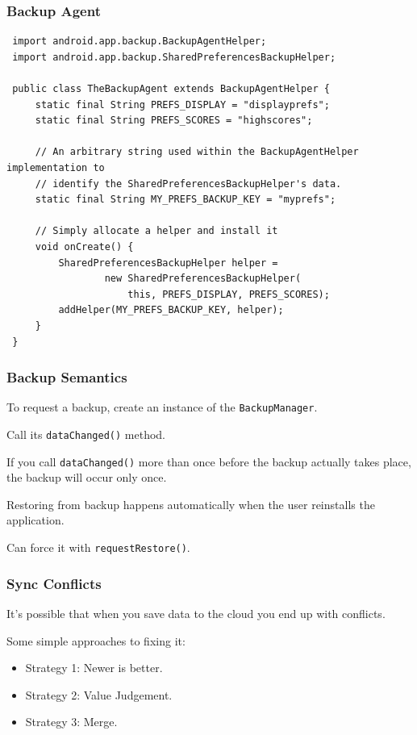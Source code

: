 \begin{frame}[fragile]
\frametitle{Backup Agent}

{\scriptsize
\begin{verbatim}
 import android.app.backup.BackupAgentHelper;
 import android.app.backup.SharedPreferencesBackupHelper;

 public class TheBackupAgent extends BackupAgentHelper {
     static final String PREFS_DISPLAY = "displayprefs";
     static final String PREFS_SCORES = "highscores";

     // An arbitrary string used within the BackupAgentHelper implementation to
     // identify the SharedPreferencesBackupHelper's data.
     static final String MY_PREFS_BACKUP_KEY = "myprefs";

     // Simply allocate a helper and install it
     void onCreate() {
         SharedPreferencesBackupHelper helper =
                 new SharedPreferencesBackupHelper(
                     this, PREFS_DISPLAY, PREFS_SCORES);
         addHelper(MY_PREFS_BACKUP_KEY, helper);
     }
 }
\end{verbatim}
}

\end{frame}

\begin{frame}
\frametitle{Backup Semantics}
\begin{changemargin}{1cm}
To request a backup, create an instance of the \texttt{BackupManager}.

Call its \texttt{dataChanged()} method.

If you call \texttt{dataChanged()} more than once before the backup actually takes place, the backup will occur only once.

Restoring from backup happens automatically when the user reinstalls the application.

Can force it with \texttt{requestRestore()}. 
\end{changemargin}
\end{frame}


\begin{frame}
\frametitle{Sync Conflicts}
\begin{changemargin}{1cm}
It's possible that when you save data to the cloud you end up with conflicts. 

Some simple approaches to fixing it:

\begin{itemize}
\item Strategy 1: Newer is better.
\item Strategy 2: Value Judgement.
\item Strategy 3: Merge.
\end{itemize}
\end{changemargin}
\end{frame}


